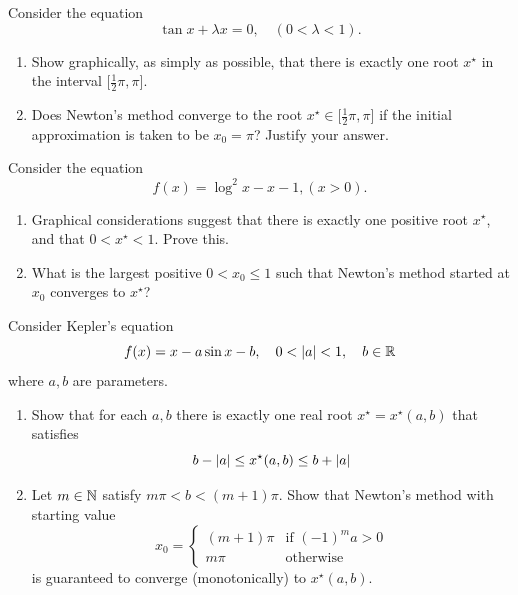 \begin{problem}[Intermediate]\cite[p.251 \#16]{gautschi2011numerical}
Consider the equation 
\begin{equation*}
\tan x + \lambda x = 0, \quad (0 < \lambda < 1).
\end{equation*}
\begin{enumerate}
	\item Show graphically, as simply as possible, that there is exactly one root $x^\star$ in the interval $\big[ \frac{1}{2}\pi, \pi\big]$.
	\item Does Newton's method converge to the root $x^\star \in \big[ \frac{1}{2}\pi, \pi\big]$ if the initial approximation is taken to be $x_0 = \pi$?  Justify your answer.
\end{enumerate}
\end{problem}

\begin{problem}[Intermediate]\cite[p.252 \#17]{gautschi2011numerical}
Consider the equation 
\begin{equation*}
f(x) = \log^2 x - x -1, (x > 0).
\end{equation*} 
\begin{enumerate}
	\item Graphical considerations suggest that there is exactly one positive root $x^\star$, and that $0 <x^\star < 1$.  Prove this.
	\item What is the largest positive $0<x_0\leq 1$ such that Newton's method started at $x_0$ converges to $x^\star$?
\end{enumerate}
\end{problem}

\begin{problem}[Advanced]\cite[p.252 \#18]{gautschi2011numerical}
Consider Kepler's equation
\begin{equation*}
f(x) = x -a \sin x - b, \quad 0 <\lvert a \rvert<1, \quad b \in \mathbb{R}
\end{equation*}
where $a, b$ are parameters.
\begin{enumerate}
	\item Show that for each $a,b$ there is exactly one real root $x^\star = x^\star(a,b)$ that satisfies
	\begin{equation*}
	b-\lvert a \rvert \leq x^\star(a,b) \leq b+\lvert a \rvert
	\end{equation*} 
	\item Let $m \in \mathbb{N}$ satisfy $m\pi < b < (m+1)\pi$.  Show that Newton's method with starting value
	\begin{equation*}
	x_0 = \begin{cases}
	(m+1)\pi &\text{if }(-1)^ma >0 \\
	m\pi &\text{otherwise}
	\end{cases}
	\end{equation*}
	is guaranteed to converge (monotonically) to $x^\star(a,b)$.
\end{enumerate}
\end{problem}

